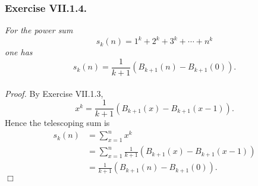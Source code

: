 \documentclass{article}
\begin{document}
\subsubsection*{Exercise VII.1.4.}
\emph{For the power sum
\[
  s_k(n) = 1^k + 2^k + 3^k + \cdots + n^k
\]
one has}
\[
  s_k(n) = \frac{1}{k+1} (B_{k+1}(n) - B_{k+1}(0)).
\] \\



\emph{Proof.}
  By Exercise VII.1.3,
  \[
    x^k = \frac{1}{k+1} (B_{k+1}(x) - B_{k+1}(x-1)).
  \]
  Hence the telescoping sum is
  \begin{align*}
     s_k(n)
     &= \sum_{x=1}^{n} x^k \\
     &= \sum_{x=1}^{n} \frac{1}{k+1} (B_{k+1}(x) - B_{k+1}(x-1)) \\
     &= \frac{1}{k+1} (B_{k+1}(n) - B_{k+1}(0)).
  \end{align*}
$\Box$ \\\\



\end{document}
